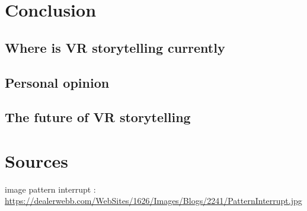 \documentclass{report}
\begin{document}
				\chapter{Conclusion}
				\section{Where is VR storytelling currently}
				
				\section{Personal opinion}
				
				\section{The future of VR storytelling}
				
				\chapter{Sources}
				
				image pattern interrupt : \href{https://dealerwebb.com/WebSites/1626/Images/Blogs/2241/PatternInterrupt.jpg}{https://dealerwebb.com/WebSites/1626/Images/Blogs/2241/PatternInterrupt.jpg}
				
		
\end{document}
